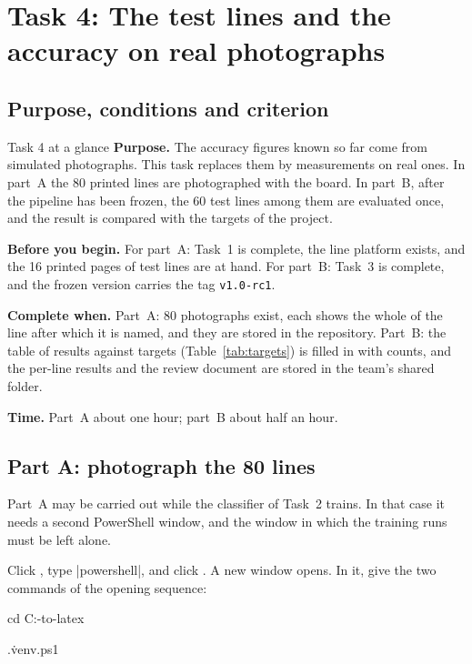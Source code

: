 \section{Task 4: The test lines and the accuracy on real photographs}
\label{sec:t4}

\subsection{Purpose, conditions and criterion}

\begin{plain}{Task 4 at a glance}
\textbf{Purpose.} The accuracy figures known so far come from simulated photographs. This task
replaces them by measurements on real ones. In part~A the 80 printed lines are photographed
with the board. In part~B, after the pipeline has been frozen, the 60 test lines among them are
evaluated once, and the result is compared with the targets of the project.

\textbf{Before you begin.} For part~A: Task~1 is complete, the line platform exists, and the 16
printed pages of test lines are at hand. For part~B: Task~3 is complete, and the frozen version
carries the tag \texttt{v1.0-rc1}.

\textbf{Complete when.} Part~A: 80 photographs exist, each shows the whole of the line after
which it is named, and they are stored in the repository. Part~B: the table of results against
targets (Table~\ref{tab:targets}) is filled in with counts, and the per-line results and the
review document are stored in the team's shared folder.

\textbf{Time.} Part~A about one hour; part~B about half an hour.
\end{plain}

\subsection{Part A: photograph the 80 lines}
\label{sec:t4a}

Part~A may be carried out while the classifier of Task~2 trains. In that case it needs a second
PowerShell window, and the window in which the training runs must be left alone.

Click , type \code|powershell|, and click . A new window opens.
In it, give the two commands of the opening sequence:
\begin{ps}
cd C:\camera-to-latex
\end{ps}
\begin{ps}
.\.venv\Scripts\Activate.ps1
\end{ps}
\venvprompt

